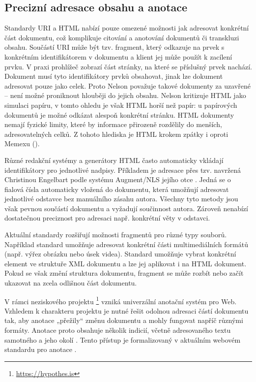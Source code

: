 \subsection{Precizní adresace obsahu a anotace}

Standardy URI a HTML nabízí pouze omezené možnosti jak adresovat konkrétní část dokumentu, což komplikuje citování a anotování dokumentů či transkluzi obsahu. Součástí URI může být tzv. fragment, který odkazuje na prvek s konkrétním identifikátorem v dokumentu \autocite[3]{RFC3236} a klient jej může použít k zacílení prvku. V praxi prohlížeč zobrazí část stránky, na které se příslušný prvek nachází. Dokument musí tyto identifikátory prvků obsahovat, jinak lze dokument adresovat pouze jako celek. Proto Nelson považuje takové dokumenty za uzavřené -- není možné proniknout hlouběji do jejich obsahu. Nelson kritizuje HTML jako simulaci papíru, v tomto ohledu je však HTML horší než papír: u papírových dokumentů je možné odkázat alespoň konkrétní stránku. HTML dokumenty nemají fyzické limity, které by informace přirozeně rozdělily do menších, adresovatelných celků. Z tohoto hlediska je HTML krokem zpátky i oproti Memexu ().

Různé redakční systémy a generátory HTML často automaticky vkládají identifikátory pro jednotlivé nadpisy. Příkladem je adresace přes tzv.  navržená Christinou Engelbart podle systému Augment/NLS jejího otce \autocite{PurpleNumbers}. Jedná se o fialová čísla automaticky vložená do dokumentu, která umožňují adresovat jednotlivé odstavce bez manuálního zásahu autora. Všechny tyto metody jsou však pevnou součástí dokumentu a vyžadují součinnost autora. Zároveň nenabízí dostatečnou preciznost pro adresaci např. konkrétní věty v odstavci.

Aktuální standardy rozšiřují možnosti fragmentů pro různé typy souborů. Například standard  \autocite{W3C:MediaFrag} umožňuje adresovat konkrétní části multimediálních formátů (např. výřez obrázku nebo úsek videa). Standard  umožňuje vybrat konkrétní element ve struktuře XML dokumentu \autocite[5]{RFC7303} a lze jej aplikovat i na HTML dokument. Pokud se však změní struktura dokumentu, fragment se může rozbít nebo začít ukazovat na zcela odlišnou část dokumentu.

V rámci neziskového projektu \footnote{\url{https://hypothes.is}} vzniká univerzální anotační systém pro Web. Vzhledem k charakteru projektu je nutné řešit odolnou adresaci částí dokumentu tak, aby anotace „přežily“ změnu dokumentu a mohly fungovat napříč různými formáty. Anotace proto obsahuje několik indicií, včetně adresovaného textu samotného a jeho okolí \autocite{Hypo:Fuzzy}. Tento přístup je formalizovaný v aktuálním webovém standardu pro anotace \autocite[4]{W3C:AnnoModel}.

